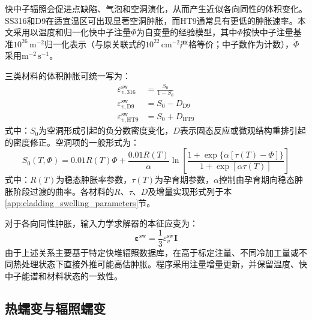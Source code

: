 快中子辐照会促进点缺陷、气泡和空洞演化，从而产生近似各向同性的体积变化。SS316和D9在适宜温区可出现显著空洞肿胀，而HT9通常具有更低的肿胀速率。本文采用以温度和归一化快中子注量$\varPhi$为自变量的经验模型，其中$\varPhi$按快中子注量基准$10^{26}\,\mathrm{m^{-2}}$归一化表示（与原关联式的$10^{22}\,\mathrm{cm^{-2}}$严格等价；中子数作为计数），$\dot{\varPhi}$采用$\mathrm{m^{-2}\,s^{-1}}$\cite{halesBISONTheoryManual2016,hofmanMetallicFuelsHandbook2019}。

三类材料的体积肿胀可统一写为：
\begin{subequations}\label{eq:clad_volumetric_swelling_models}
	\begin{align}
		\varepsilon_{v,316}^{\mathrm{sw}}
		&=\frac{S_0}{1-S_0}
		\label{eq:ss316_volumetric_swelling}\\
		\varepsilon_{v,\mathrm{D9}}^{\mathrm{sw}}
		&=S_0-D_{\mathrm{D9}}
		\label{eq:d9_volumetric_swelling}\\
		\varepsilon_{v,\mathrm{HT9}}^{\mathrm{sw}}
		&=S_0+D_{\mathrm{HT9}}
		\label{eq:ht9_volumetric_swelling}
	\end{align}
\end{subequations}
\noindent 式中：$S_0$为空洞形成引起的负分数密度变化，$D$表示固态反应或微观结构重排引起的密度修正。空洞项的一般形式为：
\begin{equation}
	S_0(T,\varPhi)
	=0.01R(T)\varPhi+
	\frac{0.01R(T)}{\alpha}
	\ln\!\left[
	\frac{1+\exp\{\alpha[\tau(T)-\varPhi]\}}
	{1+\exp[\alpha\tau(T)]}
	\right]
	\label{eq:clad_void_swelling_inventory}
\end{equation}
\noindent 式中：$R(T)$为稳态肿胀率参数，$\tau(T)$为孕育期参数，$\alpha$控制由孕育期向稳态肿胀阶段过渡的曲率。各材料的$R$、$\tau$、$D$及增量实现形式列于本\ref{app:cladding_swelling_parameters}节。

对于各向同性肿胀，输入力学求解器的本征应变为：
\begin{equation}
	\boldsymbol{\varepsilon}^{\mathrm{sw}}
	=\frac{1}{3}\varepsilon_v^{\mathrm{sw}}\boldsymbol I
	\label{eq:clad_isotropic_swelling_eigenstrain}
\end{equation}
由于上述关系主要基于特定快堆辐照数据库，在高于标定注量、不同冷加工量或不同热处理状态下直接外推可能高估肿胀。程序采用注量增量更新，并保留温度、快中子能谱和材料状态的一致性。

\subsection{热蠕变与辐照蠕变}
\label{sec:cladding_creep}

